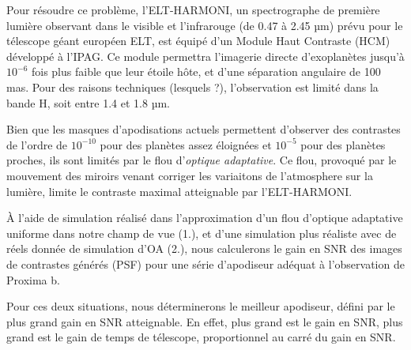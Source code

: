Pour résoudre ce problème, l'ELT-HARMONI, un spectrographe de première lumière observant dans le visible et l'infrarouge (de 0.47 à 2.45 µm) prévu pour le télescope géant européen ELT, est équipé d'un Module Haut Contraste (HCM) développé à l'IPAG. Ce module permettra l'imagerie directe d'exoplanètes jusqu'à $10^{-6}$ fois plus faible que leur étoile hôte, et d'une séparation angulaire de 100 mas. Pour des raisons techniques (lesquels ?), l'observation est limité dans la bande H, soit entre 1.4 et 1.8 µm.


Bien que les masques d'apodisations actuels permettent d'observer des contrastes de l'ordre de $10^{-10}$ pour des planètes assez éloignées et $10^{-5}$ pour des planètes proches, ils sont limités par le flou d'\textsl{optique adaptative}. Ce flou, provoqué par le mouvement des miroirs venant corriger les variaitons de l'atmosphere sur la lumière, limite le contraste maximal atteignable par l'ELT-HARMONI.

À l’aide de simulation réalisé dans l’approximation d’un flou d’optique adaptative uniforme dans notre champ de vue (1.), et d’une simulation plus réaliste avec de réels donnée de simulation d’OA (2.), nous calculerons le gain en SNR des images de contrastes générés (PSF) pour une série d’apodiseur adéquat à l’observation de Proxima b.

Pour ces deux situations, nous déterminerons le meilleur apodiseur, défini par le plus grand gain en SNR atteignable. En effet, plus grand est le gain en SNR, plus grand est le gain de temps de télescope, proportionnel au carré du gain en SNR.





